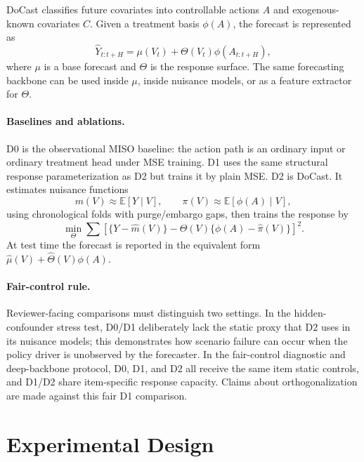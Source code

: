 \documentclass[11pt]{article}
\newcommand{\E}{\mathbb{E}}
\begin{document}
DoCast classifies future covariates into controllable actions $A$ and
exogenous-known covariates $C$. Given a treatment basis $\phi(A)$, the forecast
is represented as
\begin{equation}
  \hat Y_{t:t+H} = \mu(V_t) + \Theta(V_t)\phi(A_{t:t+H}),
  \label{eq:structural}
\end{equation}
where $\mu$ is a base forecast and $\Theta$ is the response surface. The same
forecasting backbone can be used inside $\mu$, inside nuisance models, or as a
feature extractor for $\Theta$.

\paragraph{Baselines and ablations.}
D0 is the observational MISO baseline: the action path is an ordinary input or
ordinary treatment head under MSE training. D1 uses the same structural response
parameterization as D2 but trains it by plain MSE. D2 is DoCast. It estimates
nuisance functions
\begin{equation}
  m(V)\approx\E[Y\mid V],
  \qquad
  \pi(V)\approx\E[\phi(A)\mid V],
\end{equation}
using chronological folds with purge/embargo gaps, then trains the response by
\begin{equation}
  \min_{\Theta}
  \sum
  \left[
    \{Y-\hat m(V)\}
    -
    \Theta(V)\{\phi(A)-\hat \pi(V)\}
  \right]^2 .
  \label{eq:orthogonal}
\end{equation}
At test time the forecast is reported in the equivalent form
$\hat \mu(V)+\hat\Theta(V)\phi(A)$.

\paragraph{Fair-control rule.}
Reviewer-facing comparisons must distinguish two settings. In the
hidden-confounder stress test, D0/D1 deliberately lack the static proxy that D2
uses in its nuisance models; this demonstrates how scenario failure can occur
when the policy driver is unobserved by the forecaster. In the fair-control
diagnostic and deep-backbone protocol, D0, D1, and D2 all receive the same item
static controls, and D1/D2 share item-specific response capacity. Claims about
orthogonalization are made against this fair D1 comparison.

\section{Experimental Design}
\end{document}
